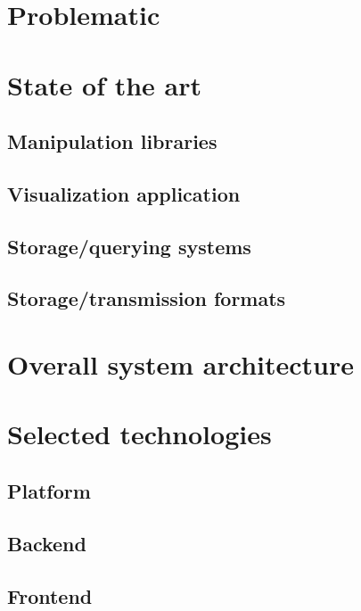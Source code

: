 
\section{Problematic}
\label{sec:case/problem}

\section{State of the art}
\label{sec:case/art}

\subsection{Manipulation libraries}
\subsection{Visualization application}
\subsection{Storage/querying systems}
\subsection{Storage/transmission formats}
\label{sec:case/art/formats}

\section{Overall system architecture}
\label{sec:case/arch}

\section{Selected technologies}
\label{sec:case/tech}

\subsection{Platform}
\subsection{Backend}
\subsection{Frontend}
